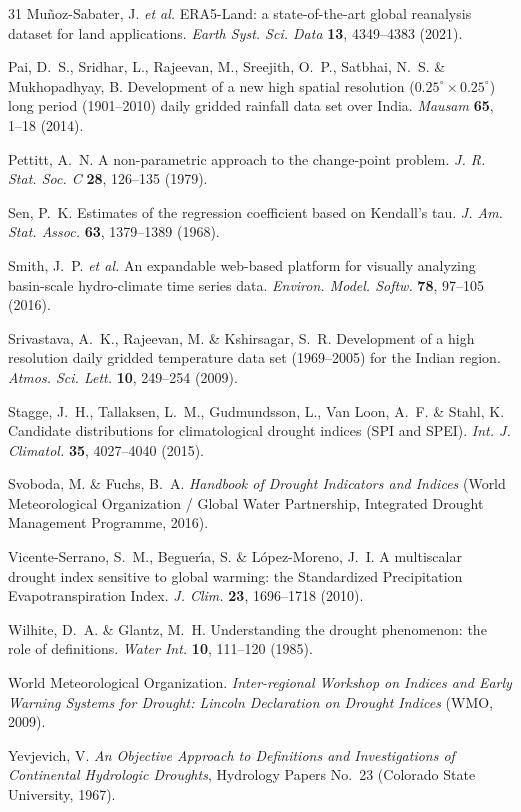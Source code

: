 \documentclass[10pt,a4paper]{article}
\begin{document}
\begin{thebibliography}{31}
 Mu\~{n}oz-Sabater, J. \textit{et al.} ERA5-Land: a state-of-the-art global reanalysis dataset for land applications. \textit{Earth Syst. Sci. Data} \textbf{13}, 4349--4383 (2021).

 Pai, D.~S., Sridhar, L., Rajeevan, M., Sreejith, O.~P., Satbhai, N.~S. \& Mukhopadhyay, B. Development of a new high spatial resolution ($0.25^\circ\times0.25^\circ$) long period (1901--2010) daily gridded rainfall data set over India. \textit{Mausam} \textbf{65}, 1--18 (2014).

 Pettitt, A.~N. A non-parametric approach to the change-point problem. \textit{J. R. Stat. Soc. C} \textbf{28}, 126--135 (1979).

 Sen, P.~K. Estimates of the regression coefficient based on Kendall's tau. \textit{J. Am. Stat. Assoc.} \textbf{63}, 1379--1389 (1968).

 Smith, J.~P. \textit{et al.} An expandable web-based platform for visually analyzing basin-scale hydro-climate time series data. \textit{Environ. Model. Softw.} \textbf{78}, 97--105 (2016).

 Srivastava, A.~K., Rajeevan, M. \& Kshirsagar, S.~R. Development of a high resolution daily gridded temperature data set (1969--2005) for the Indian region. \textit{Atmos. Sci. Lett.} \textbf{10}, 249--254 (2009).

 Stagge, J.~H., Tallaksen, L.~M., Gudmundsson, L., Van Loon, A.~F. \& Stahl, K. Candidate distributions for climatological drought indices (SPI and SPEI). \textit{Int. J. Climatol.} \textbf{35}, 4027--4040 (2015).

 Svoboda, M. \& Fuchs, B.~A. \textit{Handbook of Drought Indicators and Indices} (World Meteorological Organization / Global Water Partnership, Integrated Drought Management Programme, 2016).

 Vicente-Serrano, S.~M., Beguer\'{\i}a, S. \& L\'{o}pez-Moreno, J.~I. A multiscalar drought index sensitive to global warming: the Standardized Precipitation Evapotranspiration Index. \textit{J. Clim.} \textbf{23}, 1696--1718 (2010).

 Wilhite, D.~A. \& Glantz, M.~H. Understanding the drought phenomenon: the role of definitions. \textit{Water Int.} \textbf{10}, 111--120 (1985).

 World Meteorological Organization. \textit{Inter-regional Workshop on Indices and Early Warning Systems for Drought: Lincoln Declaration on Drought Indices} (WMO, 2009).

 Yevjevich, V. \textit{An Objective Approach to Definitions and Investigations of Continental Hydrologic Droughts}, Hydrology Papers No.~23 (Colorado State University, 1967).

\end{thebibliography}
\end{document}
